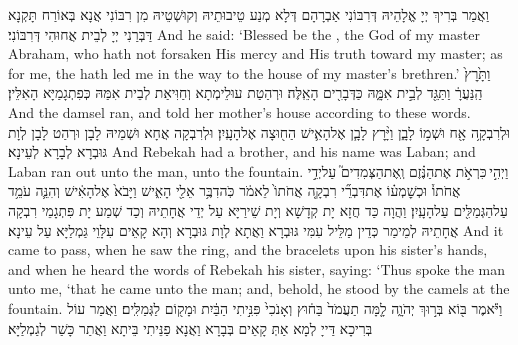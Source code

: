 {וַאֲמַר בְּרִיךְ יְיָ אֱלָהֵיהּ דְּרִבּוֹנִי אַבְרָהָם דְּלָא מְנַע טֵיבוּתֵיהּ וְקוּשְׁטֵיהּ מִן רִבּוֹנִי אֲנָא בְּאוֹרַח תָּקְנָא דַּבְּרַנִי יְיָ לְבֵית אֲחוּהִי דְּרִבּוֹנִי׃}
{And he said: ‘Blessed be the \lord, the God of my master Abraham, who hath not forsaken His mercy and His truth toward my master; as for me, the \lord\space hath led me in the way to the house of my master’s brethren.’}{}
{וַתָּ֙רׇץ֙ הַֽנַּעֲרָ֔ וַתַּגֵּ֖ד לְבֵ֣ית אִמָּ֑הּ כַּדְּבָרִ֖ים הָאֵֽלֶּה׃}
{וּרְהַטַת עוּלֵימְתָא וְחַוִּיאַת לְבֵית אִמַּהּ כְּפִתְגָמַיָּא הָאִלֵּין׃}
{And the damsel ran, and told her mother’s house according to these words.}{}
{וּלְרִבְקָ֥ה אָ֖ח וּשְׁמ֣וֹ לָבָ֑ן וַיָּ֨רׇץ לָבָ֧ן אֶל\maqqaf הָאִ֛ישׁ הַח֖וּצָה אֶל\maqqaf הָעָֽיִן׃}
{וּלְרִבְקָה אֲחָא וּשְׁמֵיהּ לָבָן וּרְהַט לָבָן לְוָת גּוּבְרָא לְבָרָא לְעֵינָא׃}
{And Rebekah had a brother, and his name was Laban; and Laban ran out unto the man, unto the fountain.}{}
{וַיְהִ֣י \legarmeh  כִּרְאֹ֣ת אֶת\maqqaf הַנֶּ֗זֶם וְֽאֶת\maqqaf הַצְּמִדִים֮ עַל\maqqaf יְדֵ֣י אֲחֹתוֹ֒ וּכְשׇׁמְע֗וֹ אֶת\maqqaf דִּבְרֵ֞י רִבְקָ֤ה אֲחֹתוֹ֙ לֵאמֹ֔ר כֹּֽה\maqqaf דִבֶּ֥ר אֵלַ֖י הָאִ֑ישׁ וַיָּבֹא֙ אֶל\maqqaf הָאִ֔ישׁ וְהִנֵּ֛ה עֹמֵ֥ד עַל\maqqaf הַגְּמַלִּ֖ים עַל\maqqaf הָעָֽיִן׃}
{וַהֲוָה כַּד חֲזָא יָת קְדָשָׁא וְיָת שֵׁירַיָּא עַל יְדֵי אֲחָתֵיהּ וְכַד שְׁמַע יָת פִּתְגָמֵי רִבְקָה אֲחָתֵיהּ לְמֵימַר כְּדֵין מַלֵּיל עִמִּי גּוּבְרָא וַאֲתָא לְוָת גּוּבְרָא וְהָא קָאֵים עִלָּוֵי גַּמְלַיָּא עַל עֵינָא׃}
{And it came to pass, when he saw the ring, and the bracelets upon his sister’s hands, and when he heard the words of Rebekah his sister, saying: ‘Thus spoke the man unto me, ‘that he came unto the man; and, behold, he stood by the camels at the fountain.}{}
{וַיֹּ֕אמֶר בּ֖וֹא בְּר֣וּךְ יְהֹוָ֑ה לָ֤מָּה תַעֲמֹד֙ בַּח֔וּץ וְאָנֹכִי֙ פִּנִּ֣יתִי הַבַּ֔יִת וּמָק֖וֹם לַגְּמַלִּֽים׃}
{וַאֲמַר עוֹל בְּרִיכָא דַּייָ לְמָא אַתְּ קָאֵים בְּבָרָא וַאֲנָא פַנֵּיתִי בֵּיתָא וַאֲתַר כָּשַׁר לְגַמְלַיָּא׃}
